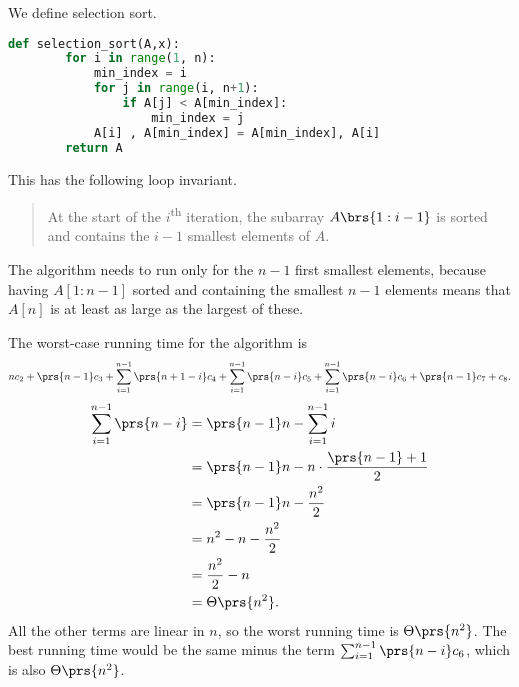 \documentclass[oneside]{scrbook}
\theoremstyle{definition}
\begin{document}
\begin{exercise}\label{exercise:selection-sort}
We define selection sort.
    \begin{lstlisting}[language=Python]
    def selection_sort(A,x):
        for i in range(1, n):
            min_index = i
            for j in range(i, n+1):
                if A[j] < A[min_index]:
                    min_index = j
            A[i] , A[min_index] = A[min_index], A[i]
    	return A
    \end{lstlisting}
This has the following loop invariant.

\begin{quote}
    At the start of the $i$\textsuperscript{th} iteration, the subarray $A\brs{1 : i-1}$ is sorted and contains the $i-1$ smallest elements of $A$.
\end{quote}

The algorithm needs to run only for the $n-1$ first smallest elements, because having $A[1:n-1]$ sorted and containing the smallest $n-1$ elements means that $A[n]$ is at least as large as the largest of these.

The worst-case running time for the algorithm is
\[n c_2 + \prs{n-1} c_3 + \sum_{i = 1}^{n-1}\prs{n+1-i} c_4 + \sum_{i=1}^{n-1} \prs{n-i} c_5 + \sum_{i=1}^{n-1} \prs{n-i} c_6 + \prs{n-1} c_7 + c_8 \text{.}\]
\begin{align*}
    \sum_{i=1}^{n-1} \prs{n - i} 
    &= \prs{n-1} n - \sum_{i=1}^{n-1} i
    \\&= \prs{n-1} n - n \cdot \frac{\prs{n-1} + 1}{2} 
    \\&= \prs{n-1}n - \frac{n^2}{2}
    \\&= n^2 - n - \frac{n^2}{2}
    \\&= \frac{n^2}{2} - n
    \\&= \Theta\prs{n^2} \text{.}
\end{align*}
All the other terms are linear in $n$, so the worst running time is $\Theta\prs{n^2}$.
The best running time would be the same minus the term $\sum_{i=1}^{n-1} \prs{n-i} c_6$, which is also $\Theta\prs{n^2}$.
\end{exercise}
\end{document}
